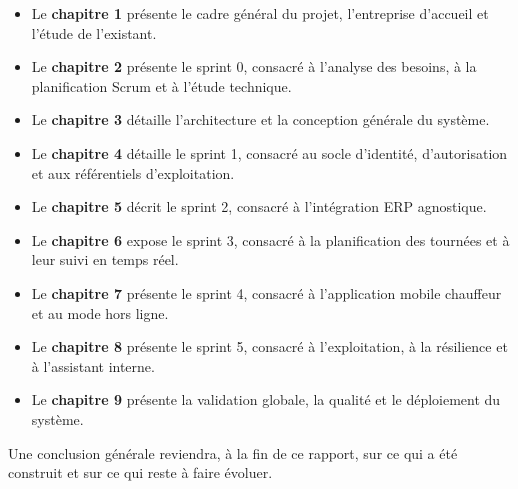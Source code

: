 \begin{itemize}
  \item Le \textbf{chapitre 1} présente le cadre général du projet, l'entreprise d'accueil et
  l'étude de l'existant.
  \item Le \textbf{chapitre 2} présente le sprint 0, consacré à l'analyse des besoins, à la
  planification Scrum et à l'étude technique.
  \item Le \textbf{chapitre 3} détaille l'architecture et la conception générale du système.
  \item Le \textbf{chapitre 4} détaille le sprint 1, consacré au socle d'identité, d'autorisation et
  aux référentiels d'exploitation.
  \item Le \textbf{chapitre 5} décrit le sprint 2, consacré à l'intégration ERP agnostique.
  \item Le \textbf{chapitre 6} expose le sprint 3, consacré à la planification des tournées et à
  leur suivi en temps réel.
  \item Le \textbf{chapitre 7} présente le sprint 4, consacré à l'application mobile chauffeur et au
  mode hors ligne.
  \item Le \textbf{chapitre 8} présente le sprint 5, consacré à l'exploitation, à la résilience et à
  l'assistant interne.
  \item Le \textbf{chapitre 9} présente la validation globale, la qualité et le déploiement du
  système.
\end{itemize}

Une conclusion générale reviendra, à la fin de ce rapport, sur ce qui a été construit et sur ce qui
reste à faire évoluer.

\clearpage
